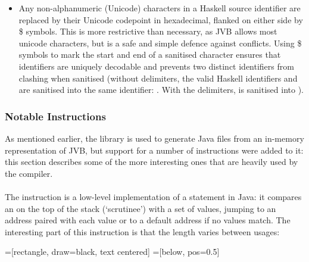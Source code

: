 \documentclass[dissertation.tex]{subfiles}
\begin{document}
{{{\begin{itemize}
{            }
            \item
            {

                Any non-alphanumeric (Unicode) characters in a Haskell source identifier are replaced by their Unicode
                codepoint in hexadecimal, flanked on either side by \$ symbols. This is more restrictive than necessary,
                as JVB allows most unicode characters, but is a safe and simple defence against conflicts. Using \$
                symbols to mark the start and end of a sanitised character ensures that identifiers are uniquely
                decodable and prevents two distinct identifiers from clashing when sanitised (without delimiters, the
                valid Haskell identifiers \haskell{#\(\pi\)#} and  are sanitised into the same identifier:
                . With the delimiters, \haskell{#\(\pi\)#} is sanitised into ).

            }
            \end{itemize}

        }
        \subsubsection{Notable Instructions}
        {

            As mentioned earlier, the  library is used to generate Java  files from
            an in-memory representation of JVB, but support for a number of instructions were added to it: this section
            describes some of the more interesting ones that are heavily used by the compiler.
            
            \paragraph*{}
            {
                
                The  instruction is a low-level implementation of a  statement in
                Java: it compares an  on the top of the stack (`scrutinee') with a set of values, jumping to
                an address paired with each value or to a default address if no values match. The interesting part of
                this instruction is that the length varies between usages:

                =[rectangle, draw=black, text centered]
                =[below, pos=0.5]

}}}}
\end{document}
